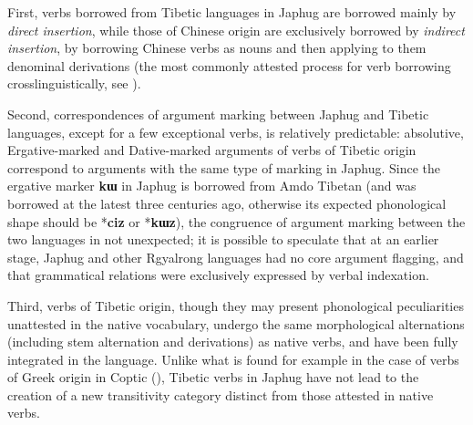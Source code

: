 \documentclass[oneside,a4paper,11pt]{article}
\newcommand{\ipa}[1]{{\phon\textbf{\mbox{#1}}}} %
\begin{document}
First, verbs borrowed from Tibetic languages in Japhug are borrowed mainly by \textit{direct insertion}, while those of Chinese origin are exclusively borrowed by \textit{indirect insertion}, by borrowing Chinese verbs as nouns and then applying to them denominal derivations (the most commonly attested process for verb borrowing crosslinguistically, see \citealt{wohlgemuth09verbal}). 

Second, correspondences of argument marking between Japhug and Tibetic languages, except for a few exceptional verbs, is relatively predictable: absolutive, Ergative-marked and Dative-marked arguments of verbs of Tibetic origin correspond to arguments with the same type of marking in Japhug. Since the ergative marker \ipa{kɯ} in Japhug is borrowed from Amdo Tibetan (and was borrowed at the latest three centuries ago, otherwise its expected phonological shape should be *\ipa{ciz} or *\ipa{kɯz}), the congruence of argument marking between the two languages in not unexpected; it is possible to speculate that at an earlier stage, Japhug and other Rgyalrong languages  had no core argument flagging, and that grammatical relations were exclusively expressed by verbal indexation.

Third, verbs of Tibetic origin, though they may present phonological peculiarities unattested in the native vocabulary, undergo the same morphological alternations (including stem alternation and derivations) as native verbs, and have been fully integrated in the language. Unlike what is found for example in the case of verbs of Greek origin in Coptic (\citealt{grossmann16contact}), Tibetic verbs in Japhug have not lead to the creation of a new transitivity category distinct from those attested in native verbs. 




\end{document}
